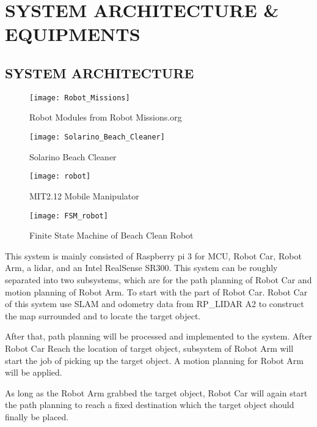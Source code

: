 \section{SYSTEM ARCHITECTURE \& EQUIPMENTS}

\subsection{SYSTEM ARCHITECTURE}


\begin{figure}[!t]
\texttt{[image: Robot\_Missions]}
\centering
\caption{Robot Modules from Robot Missions.org}
\label{figure:robot_missions}
\end{figure}

\begin{figure}[!t]
\texttt{[image: Solarino\_Beach\_Cleaner]}
\centering
\caption{Solarino Beach Cleaner}
\label{figure:solarino_beach_cleaner}
\end{figure}

\begin{figure}[!t]
\texttt{[image: robot]}
\centering
\caption{MIT2.12 Mobile Manipulator}
\label{figure:mit212mm}
\end{figure}

\begin{figure*}[!t]
\texttt{[image: FSM\_robot]}
\centering
\caption{Finite State Machine of Beach Clean Robot}
\label{figure:FSM_robot}
\end{figure*}

This system is mainly consisted of Raspberry pi 3 for MCU, Robot Car, Robot Arm, a lidar, and an Intel RealSense SR300. This system can be roughly separated into two subsystems, which are for the path planning of Robot Car and motion planning of Robot Arm. To start with the part of Robot Car. Robot Car of this system use SLAM and odometry data from RP\_LIDAR A2 to construct the map surrounded and to locate the target object. 

After that, path planning will be processed and implemented to the system. After Robot Car Reach the location of target object, subsystem of Robot Arm will start the job of picking up the target object. A motion planning for Robot Arm will be applied. 

As long as the Robot Arm grabbed the target object, Robot Car will again start the path planning to reach a fixed destination which the target object should finally be placed. 

